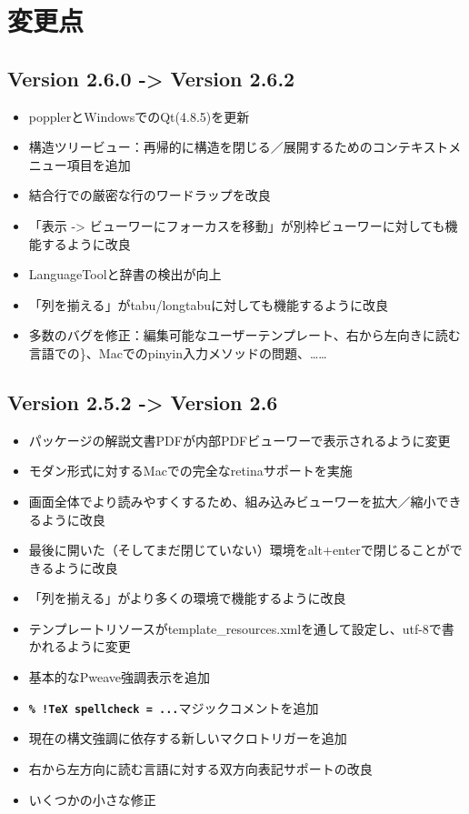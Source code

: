 \chapter{変更点}

\section{Version 2.6.0 -\textgreater{} Version 2.6.2}

\begin{itemize}
\item
  popplerとWindowsでのQt(4.8.5)を更新
\item
  構造ツリービュー：再帰的に構造を閉じる／展開するためのコンテキストメニュー項目を追加
\item
  結合行での厳密な行のワードラップを改良
\item
  「表示 -\textgreater{}
  ビューワーにフォーカスを移動」が別枠ビューワーに対しても機能するように改良
\item
  LanguageToolと辞書の検出が向上
\item
  「列を揃える」がtabu/longtabuに対しても機能するように改良
\item
  多数のバグを修正：編集可能なユーザーテンプレート、右から左向きに読む言語での\}、Macでのpinyin入力メソッドの問題、……
\end{itemize}

\section{Version 2.5.2 -\textgreater{} Version 2.6}

\begin{itemize}
\item
  パッケージの解説文書PDFが内部PDFビューワーで表示されるように変更
\item
  モダン形式に対するMacでの完全なretinaサポートを実施
\item
  画面全体でより読みやすくするため、組み込みビューワーを拡大／縮小できるように改良
\item
  最後に開いた（そしてまだ閉じていない）環境をalt+enterで閉じることができるように改良
\item
  「列を揃える」がより多くの環境で機能するように改良
\item
  テンプレートリソースがtemplate\_resources.xmlを通して設定し、utf-8で書かれるように変更
\item
  基本的なPweave強調表示を追加
\item
  \textbf{\texttt{\% !TeX spellcheck = ...}}マジックコメントを追加
\item
  現在の構文強調に依存する新しいマクロトリガーを追加
\item
  右から左方向に読む言語に対する双方向表記サポートの改良
\item
  いくつかの小さな修正
\end{itemize}


